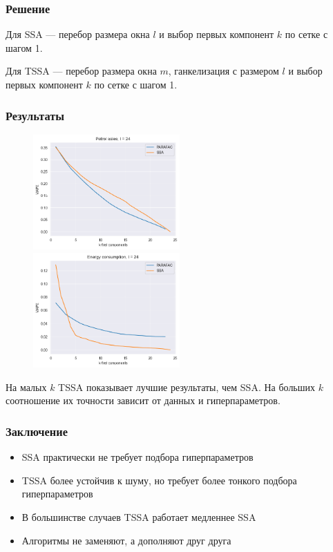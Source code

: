 \documentclass[
	11pt, %
]{beamer}
\begin{document}
\begin{frame}
    \frametitle{Решение}

Для SSA --- перебор размера окна \(l\) и выбор первых компонент \(k\) по сетке с шагом 1.

Для TSSA --- перебор размера окна \(m\), ганкелизация с размером \(l\) и выбор первых компонент \(k\) по сетке с шагом 1.

\end{frame}

\begin{frame}
	\frametitle{Результаты}

\begin{figure}
	\centering
	\includegraphics[width=0.5\textwidth]{images/result_good.png}%
	\includegraphics[width=0.5\textwidth]{images/result_bad.png}
	\label{fig:result}
\end{figure}

На малых \(k\) TSSA показывает лучшие результаты, чем SSA. На больших \(k\) соотношение их точности зависит от данных и гиперпараметров.

\end{frame}


\begin{frame}
	\frametitle{Заключение}

\begin{itemize}
	\item SSA практически не требует подбора гиперпараметров
    \item TSSA более устойчив к шуму, но требует более тонкого подбора гиперпараметров
    \item В большинстве случаев TSSA работает медленнее SSA
    \item Алгоритмы не заменяют, а дополняют друг друга
\end{itemize}

\end{frame}
\end{document}
